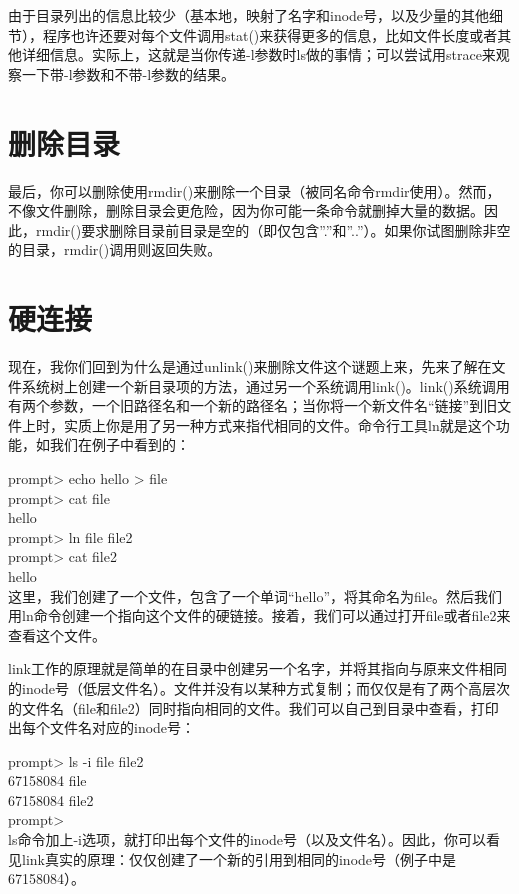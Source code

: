 由于目录列出的信息比较少（基本地，映射了名字和inode号，以及少量的其他细节），程序也许还要对每个文件调用stat()来获得更多的信息，比如文件长度或者其他详细信息。实际上，这就是当你传递-l参数时ls做的事情；可以尝试用strace来观察一下带-l参数和不带-l参数的结果。

\section{删除目录}
最后，你可以删除使用rmdir()来删除一个目录（被同名命令rmdir使用）。然而，不像文件删除，删除目录会更危险，因为你可能一条命令就删掉大量的数据。因此，rmdir()要求删除目录前目录是空的（即仅包含”.”和”..”）。如果你试图删除非空的目录，rmdir()调用则返回失败。

\section{硬连接}
现在，我你们回到为什么是通过unlink()来删除文件这个谜题上来，先来了解在文件系统树上创建一个新目录项的方法，通过另一个系统调用link()。link()系统调用有两个参数，一个旧路径名和一个新的路径名；当你将一个新文件名“链接”到旧文件上时，实质上你是用了另一种方式来指代相同的文件。命令行工具ln就是这个功能，如我们在例子中看到的：

prompt> echo hello > file\\
prompt> cat file\\
hello\\
prompt> ln file file2\\
prompt> cat file2\\
hello\\

这里，我们创建了一个文件，包含了一个单词“hello”，将其命名为file。然后我们用ln命令创建一个指向这个文件的硬链接。接着，我们可以通过打开file或者file2来查看这个文件。

link工作的原理就是简单的在目录中创建另一个名字，并将其指向与原来文件相同的inode号（低层文件名）。文件并没有以某种方式复制；而仅仅是有了两个高层次的文件名（file和file2）同时指向相同的文件。我们可以自己到目录中查看，打印出每个文件名对应的inode号：

prompt> ls -i file file2\\
67158084 file\\
67158084 file2\\
prompt>\\

ls命令加上-i选项，就打印出每个文件的inode号（以及文件名）。因此，你可以看见link真实的原理：仅仅创建了一个新的引用到相同的inode号（例子中是67158084）。

